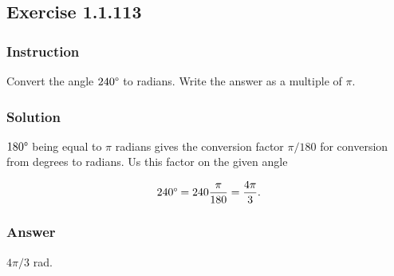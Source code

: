 \subsection*{Exercise 1.1.113}

\subsubsection*{Instruction}

Convert the angle $ 240 \degree $ to radians. Write the answer as a multiple of $ \pi $.

\subsubsection*{Solution}

$ 180 \degree $ being equal to $ \pi $ radians gives the conversion factor $ \pi / 180 $ for conversion from degrees to radians. Us this factor on the given angle

\[ \phantom{.} 240 \degree = 240\frac{\pi}{180} =
\frac{4\pi}{3} \text{.}\]

\subsubsection*{Answer}

$ 4\pi/3 $ rad.
